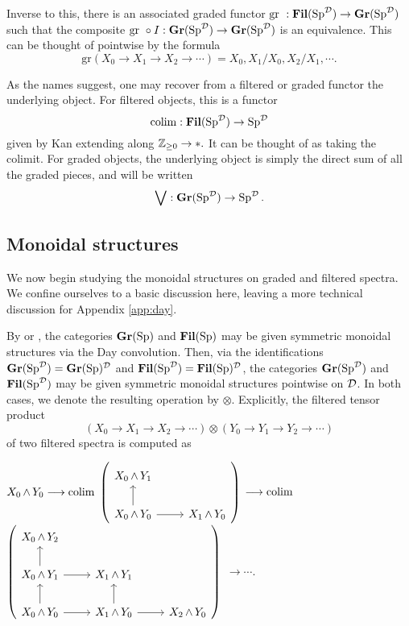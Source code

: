 Inverse to this, there is an associated graded functor $\text{gr }: \Fil(\Sp^{\D}) \to \Gr(\Sp^{\D})$ such that the composite $\text{gr }\circ I : \Gr(\Sp^{\D}) \to \Gr(\Sp^{\D})$ is an equivalence.   This can be thought of pointwise by the formula $$\text{gr}(X_0\to X_1\to X_2\to \cdots) = X_0, X_1/X_0, X_2/X_1, \cdots.$$

As the names suggest, one may recover from a filtered or graded functor the underlying object.  For filtered objects, this is a functor $$\colim : \Fil(\Sp^{\D}) \to \Sp^{\D}$$ given by Kan extending along $\Z_{\geq 0}\to *.$   It can be thought of as taking the colimit.  For graded objects, the underlying object is simply the direct sum of all the graded pieces, and will be written $$\bigvee : \Gr(\Sp^{\D}) \to \Sp^{\D}.$$



\subsection{Monoidal structures}\label{sect:monoidal}
We now begin studying the monoidal structures on graded and filtered spectra.  We confine ourselves to a basic discussion here, leaving a more technical discussion for Appendix \ref{app:day}.

By \cite{Glasman} or \cite[Example 2.2.6.17]{HA}, the categories $\Gr(\Sp)$ and $\Fil(\Sp)$ may be given symmetric monoidal structures via the Day convolution.  Then, via the identifications $\Gr(\Sp^{\D}) = \Gr(\Sp)^{\D}$ and $\Fil(\Sp^{\D}) = \Fil(\Sp)^{\D}$, the categories $\Gr(\Sp^{\D})$ and $\Fil(\Sp^{\D})$ may be given symmetric monoidal structures pointwise on $\D$.  In both cases, we denote the resulting operation by $\otimes$. Explicitly, the filtered tensor product $$\left(X_0 \longrightarrow X_1 \longrightarrow X_2 \longrightarrow \cdots \right) \otimes \left(Y_0 \longrightarrow Y_1 \longrightarrow Y_2 \longrightarrow \cdots \right)$$
of two filtered spectra is computed as

\begin{center}
$X_0 \smsh Y_0 \longrightarrow \colim $
{$ \left(\begin{tikzcd} X_0 \smsh Y_1 \\  X_0 \smsh Y_0 \arrow{u} \arrow{r} & X_1 \smsh Y_0 \end{tikzcd} \right) $} 
$\longrightarrow \colim$
 {$ \left( \begin{tikzcd} X_0 \smsh Y_2 \\ X_0 \smsh Y_1 \arrow{r} \arrow{u} & X_1 \smsh Y_1  \\ X_0 \smsh Y_0 \arrow{r} \arrow{u} & X_1 \smsh Y_0 \arrow{u} \arrow{r} & X_2 \smsh Y_0 \end{tikzcd} \right) $}
$\longrightarrow \cdots.$
\end{center}

